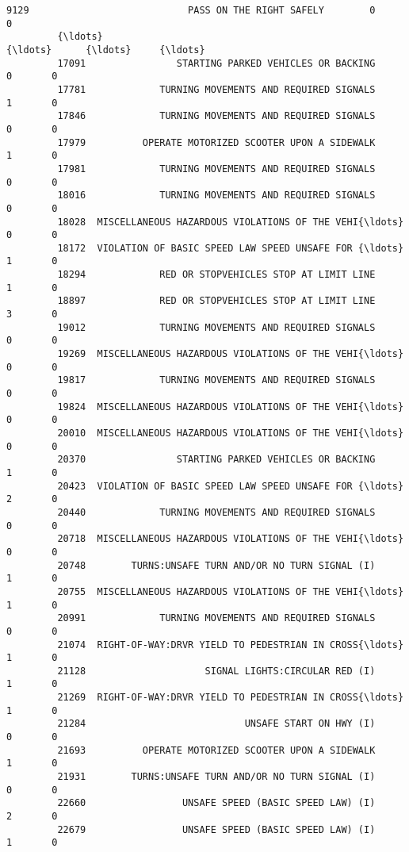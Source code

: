 \documentclass[11pt]{article}
\begin{document}
\begin{Verbatim}[commandchars=\\\{\}]
         9129                            PASS ON THE RIGHT SAFELY        0       0   
         {\ldots}                                                  {\ldots}      {\ldots}     {\ldots}   
         17091                STARTING PARKED VEHICLES OR BACKING        0       0   
         17781             TURNING MOVEMENTS AND REQUIRED SIGNALS        1       0   
         17846             TURNING MOVEMENTS AND REQUIRED SIGNALS        0       0   
         17979          OPERATE MOTORIZED SCOOTER UPON A SIDEWALK        1       0   
         17981             TURNING MOVEMENTS AND REQUIRED SIGNALS        0       0   
         18016             TURNING MOVEMENTS AND REQUIRED SIGNALS        0       0   
         18028  MISCELLANEOUS HAZARDOUS VIOLATIONS OF THE VEHI{\ldots}        0       0   
         18172  VIOLATION OF BASIC SPEED LAW SPEED UNSAFE FOR {\ldots}        1       0   
         18294             RED OR STOPVEHICLES STOP AT LIMIT LINE        1       0   
         18897             RED OR STOPVEHICLES STOP AT LIMIT LINE        3       0   
         19012             TURNING MOVEMENTS AND REQUIRED SIGNALS        0       0   
         19269  MISCELLANEOUS HAZARDOUS VIOLATIONS OF THE VEHI{\ldots}        0       0   
         19817             TURNING MOVEMENTS AND REQUIRED SIGNALS        0       0   
         19824  MISCELLANEOUS HAZARDOUS VIOLATIONS OF THE VEHI{\ldots}        0       0   
         20010  MISCELLANEOUS HAZARDOUS VIOLATIONS OF THE VEHI{\ldots}        0       0   
         20370                STARTING PARKED VEHICLES OR BACKING        1       0   
         20423  VIOLATION OF BASIC SPEED LAW SPEED UNSAFE FOR {\ldots}        2       0   
         20440             TURNING MOVEMENTS AND REQUIRED SIGNALS        0       0   
         20718  MISCELLANEOUS HAZARDOUS VIOLATIONS OF THE VEHI{\ldots}        0       0   
         20748        TURNS:UNSAFE TURN AND/OR NO TURN SIGNAL (I)        1       0   
         20755  MISCELLANEOUS HAZARDOUS VIOLATIONS OF THE VEHI{\ldots}        1       0   
         20991             TURNING MOVEMENTS AND REQUIRED SIGNALS        0       0   
         21074  RIGHT-OF-WAY:DRVR YIELD TO PEDESTRIAN IN CROSS{\ldots}        1       0   
         21128                     SIGNAL LIGHTS:CIRCULAR RED (I)        1       0   
         21269  RIGHT-OF-WAY:DRVR YIELD TO PEDESTRIAN IN CROSS{\ldots}        1       0   
         21284                            UNSAFE START ON HWY (I)        0       0   
         21693          OPERATE MOTORIZED SCOOTER UPON A SIDEWALK        1       0   
         21931        TURNS:UNSAFE TURN AND/OR NO TURN SIGNAL (I)        0       0   
         22660                 UNSAFE SPEED (BASIC SPEED LAW) (I)        2       0   
         22679                 UNSAFE SPEED (BASIC SPEED LAW) (I)        1       0   
         

\end{Verbatim}
\end{document}
